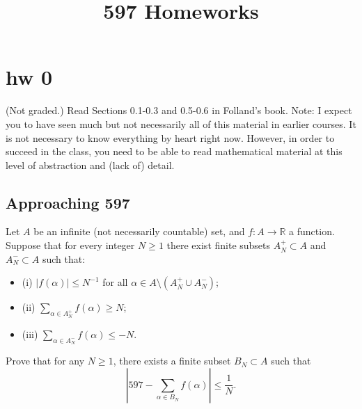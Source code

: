 \documentclass[lang=cn,11pt]{elegantbook}
\title{597 Homeworks}
\begin{document}
\frontmatter
\tableofcontents
\mainmatter



\chapter*{hw 0}

\noindent (Not graded.) Read Sections 0.1-0.3 and 0.5-0.6 in Folland’s book. Note: I expect you to have seen much but not necessarily all of this material in earlier courses. It is not necessary to know everything by heart right now. However, in order to succeed in the class, you need to be able to read mathematical material at this level of abstraction and (lack of) detail.

\section{Approaching 597}
Let $A$ be an infinite (not necessarily countable) set, and $f : A \to \mathbb{R}$ a function. Suppose that for every integer $N \geq 1$ there exist finite subsets $A^+_N \subset A$ and $A^-_N \subset A$ such that:
\begin{itemize}
    \item (i) $\lvert f(\alpha) \rvert \leq N^{-1}$ for all $\alpha \in A \setminus (A^+_N \cup A^-_N)$;
    \item (ii) $\sum_{\alpha \in A^+_N} f(\alpha) \geq N$;
    \item (iii) $\sum_{\alpha \in A^-_N} f(\alpha) \leq -N$.
\end{itemize}
Prove that for any $N \geq 1$, there exists a finite subset $B_N \subset A$ such that
\[
\left\lvert 597 - \sum_{\alpha \in B_N} f(\alpha) \right\rvert \leq \frac{1}{N}.
\]
\end{document}
